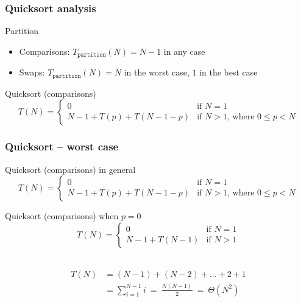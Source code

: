 \documentclass[aspectratio=169]{beamer}
\begin{document}
\begin{frame}\frametitle{Quicksort analysis}
    
  \begin{block}{Partition}
  \begin{itemize}
    \item Comparisons: $T_{\texttt{partition}}(N) = N-1$ in any case
    \item Swaps: $T_{\texttt{partition}}(N) = N$ in the worst case, $1$ in the best case
  \end{itemize}  
  \end{block}

  \begin{block}{Quicksort (comparisons)}
  $$T(N) = \left\{
    \begin{array}{ll}
      0 & \text{if }N=1
      \\
      N-1 + T(p) + T(N-1-p) & \text{if }N>1\text{, where }0\leq p < N
    \end{array}
  \right.$$
  \end{block}
\end{frame}

\begin{frame}\frametitle{Quicksort -- worst case}

  \begin{block}{Quicksort (comparisons) in general}
  $$T(N) = \left\{
    \begin{array}{ll}
      0 & \text{if }N=1
      \\
      N-1 + T(p) + T(N-1-p) & \text{if }N>1\text{, where }0\leq p < N
    \end{array}
  \right.$$
  \end{block}

  \begin{alertblock}{Quicksort (comparisons) when $p=0$}
  $$T(N) = \left\{
    \begin{array}{ll}
      0 & \text{if }N=1
      \\
      N-1 + T(N-1) & \text{if }N>1
    \end{array}
  \right.$$
  \end{alertblock}

  \pause~\\[-8mm]
  \begin{align*}
    T(N) &= (N-1)+(N-2)+\ldots+2+1
       \\&= \sum_{i=1}^{N-1} i ~=~ \frac{N(N-1)}{2} ~=~ \Theta(N^2)
  \end{align*}
\end{frame}
\end{document}
